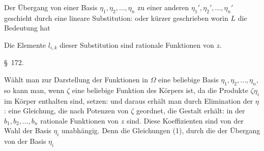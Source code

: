 Der Übergang von einer Basis $\eta_1, \eta_2, \ldots, \eta_n$ zu einer anderen $\eta_1', \eta_2', \ldots, \eta_n'$ geschieht durch eine lineare Substitution:
oder kürzer geschrieben
worin $L$ die Bedeutung hat

Die Elemente $l_{i,k}$ dieser Substitution sind rationale Funktionen von $z$.


\begin{center}
\S\ 172.

\end{center}

Wählt man zur Darstellung der Funktionen in $\Omega$ eine beliebige Basis $\eta_1, \eta_2, \ldots, \eta_n$, so kann man, wenn $\zeta$ eine beliebige Funktion des Körpers ist, da die Produkte $\zeta\eta_i$ im Körper enthalten sind, setzen:
und daraus erhält man durch Elimination der $\eta$:
eine Gleichung, die nach Potenzen von $\zeta$ geordnet, die Gestalt erhält:
in der $b_1, b_2, \ldots, b_n$ rationale Funktionen von $z$ sind. Diese Koeffizienten sind von der Wahl der Basis $\eta_i$ unabhängig. Denn die Gleichungen (1), durch die der Übergang von der Basis $\eta_i$
